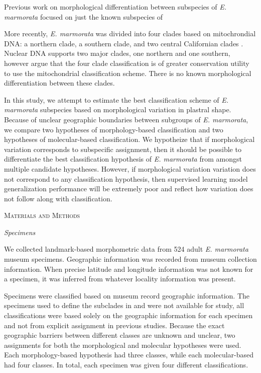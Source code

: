 \documentclass[12pt,letterpaper]{article}\usepackage{graphicx, color}
\renewcommand{\section}[1]{%
\bigskip
\begin{center}
\begin{Large}
\normalfont\scshape #1
\medskip
\end{Large}
\end{center}}
\renewcommand{\subsection}[1]{%
\bigskip
\begin{center}
\begin{large}
\normalfont\itshape #1
\end{large}
\end{center}}
\begin{document}
Previous work on morphological differentiation between subspecies of \textit{E. marmorata} focused on just the known subspecies of \citet{Seeliger1945}

More recently, \textit{E. marmorata} was divided into four clades based on mitochrondial DNA: a northern clade, a southern clade, and two central Californian clades \citep{Spinks2005,Spinks2010}. Nuclear DNA supports two major clades, one northern and one southern, however \citet{Spinks2010} argue that the four clade classification is of greater conservation utility to use the mitochondrial classification scheme.
There is no known morphological differentiation between these clades.

In this study, we attempt to estimate the best classification scheme of \textit{E. marmorata} subspecies based on morphological variation in plastral shape. Because of unclear geographic boundaries between subgroups of \textit{E. marmorata}, we compare two hypotheses of morphology-based classification and two hypotheses of molecular-based classification. We hypotheize that if morphological variation corresponds to subspecific assignment, then it should be possible to differentiate the best classification hypothesis of \textit{E. marmorata} from amongst multiple candidate hypotheses. However, if morphological variation variation does not correspond to any classification hypothesis, then supervised learning model generalization performance will be extremely poor and reflect how variation does not follow along with classification.

\section{Materials and Methods}
\subsection{Specimens}
We collected landmark-based morphometric data from 524 adult \textit{E. marmorata} museum specimens. Geographic information was recorded from museum collection information. When precise latitude and longitude information was not known for a specimen, it was inferred from whatever locality information was present. %

Specimens were classified based on museum record geographic information. The specimens used to define the subclades in \citet{Spinks2005} and \citet{Spinks2010} were not available for study, all classifications were based solely on the geographic information for each specimen and not from explicit assignment in previous studies. Because the exact geographic barriers between different classes are unknown and unclear, two assignments for both the morphological and molecular hypotheses were used. Each morphology-based hypothesis had three classes, while each molecular-based had four classes. In total, each specimen was given four different classifications. 
\end{document}
